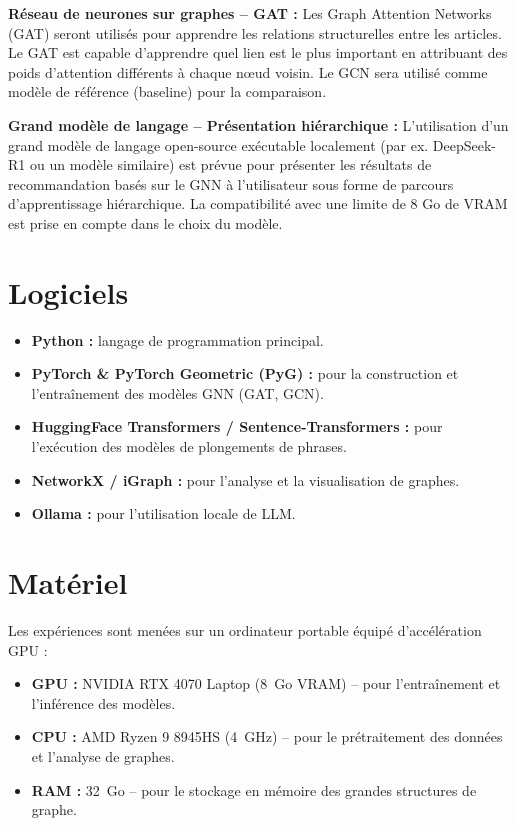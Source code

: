\textbf{Réseau de neurones sur graphes -- GAT :}
Les Graph Attention Networks (GAT) \cite{velickovic2018graph} seront utilisés pour apprendre les relations structurelles entre les articles. Le GAT est capable d'apprendre quel lien est le plus important en attribuant des poids d'attention différents à chaque n\oe ud voisin. Le GCN \cite{kipf2017semi} sera utilisé comme modèle de référence (baseline) pour la comparaison.

\textbf{Grand modèle de langage -- Présentation hiérarchique :}
L'utilisation d'un grand modèle de langage open-source exécutable localement (par ex. DeepSeek-R1 ou un modèle similaire) est prévue pour présenter les résultats de recommandation basés sur le GNN à l'utilisateur sous forme de parcours d'apprentissage hiérarchique. La compatibilité avec une limite de 8 Go de VRAM est prise en compte dans le choix du modèle.

\section{Logiciels}

\begin{itemize}
    \item \textbf{Python :} langage de programmation principal.
    \item \textbf{PyTorch \& PyTorch Geometric (PyG) :} pour la construction et l'entraînement des modèles GNN (GAT, GCN).
    \item \textbf{HuggingFace Transformers / Sentence-Transformers :} pour l'exécution des modèles de plongements de phrases.
    \item \textbf{NetworkX / iGraph :} pour l'analyse et la visualisation de graphes.
    \item \textbf{Ollama :} pour l'utilisation locale de LLM.
\end{itemize}

\section{Matériel}

Les expériences sont menées sur un ordinateur portable équipé d'accélération GPU :
\begin{itemize}
    \item \textbf{GPU :} NVIDIA RTX 4070 Laptop (8~Go VRAM) -- pour l'entraînement et l'inférence des modèles.
    \item \textbf{CPU :} AMD Ryzen 9 8945HS (4~GHz) -- pour le prétraitement des données et l'analyse de graphes.
    \item \textbf{RAM :} 32~Go -- pour le stockage en mémoire des grandes structures de graphe.
\end{itemize}